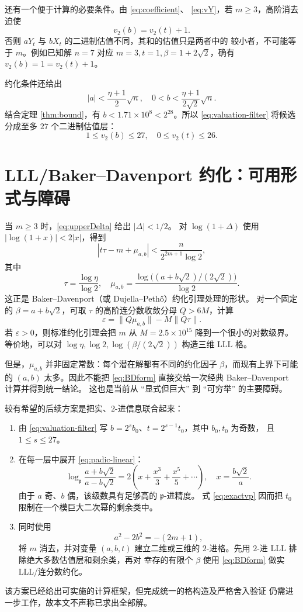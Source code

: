 \documentclass[11pt,a4paper]{ctexart}
\theoremstyle{remark}
\begin{document}
还有一个便于计算的必要条件。由 \eqref{eq:coefficient}、
\eqref{eq:vY}，若 \(m\ge3\)，高阶消去迫使
\begin{equation}\label{eq:valuation-filter}
 \boxed{v_2(b)=v_2(t)+1.}
\end{equation}
否则 \(aY_t\) 与 \(bX_t\) 的二进制估值不同，其和的估值只是两者中的
较小者，不可能等于 \(m\)。例如已知解 \(n=7\) 对应
\(m=3,t=1,\beta=1+2\sqrt2\)，确有 \(v_2(b)=1=v_2(t)+1\)。

约化条件还给出
\[
 |a|<\frac{\eta+1}{2}\sqrt n,\quad
 0<b<\frac{\eta+1}{2\sqrt2}\sqrt n.
\]
结合定理 \ref{thm:bound}，有 \(b<1.71\times10^8<2^{28}\)。所以
\eqref{eq:valuation-filter} 将候选分成至多 \(27\) 个二进制估值层：
\[
 1\le v_2(b)\le27,\quad 0\le v_2(t)\le26.
\]

\section{LLL/Baker--Davenport 约化：可用形式与障碍}

当 \(m\ge3\) 时，\eqref{eq:upperDelta} 给出 \(|\Delta|<1/2\)。
对 \(\log(1+\Delta)\) 使用 \(|\log(1+x)|<2|x|\)，得到
\begin{equation}\label{eq:BDform}
 \left|t\tau-m+\mu_{a,b}\right|
 <\frac{n}{2^{2m+1}\log2},
\end{equation}
其中
\begin{equation}\label{eq:taumu}
 \tau=\frac{\log\eta}{\log2},\quad
 \mu_{a,b}=\frac{\log\bigl((a+b\sqrt2)/(2\sqrt2)\bigr)}{\log2}.
\end{equation}
这正是 Baker--Davenport（或 Dujella--Peth\H{o}）约化引理处理的形状。
对一个固定的 \(\beta=a+b\sqrt2\)，可取 \(\tau\) 的高阶连分数收敛分母
\(Q>6M\)，计算
\[
 \varepsilon=\|Q\mu_{a,b}\|-M\|Q\tau\|.
\]
若 \(\varepsilon>0\)，则标准约化引理会把 \(m\) 从
\(M=2.5\times10^{15}\) 降到一个很小的对数级界。等价地，可以对
\(\log\eta,\log2,\log(\beta/(2\sqrt2))\) 构造三维 LLL 格。

但是，\(\mu_{a,b}\) 并非固定常数：每个潜在解都有不同的约化因子
\(\beta\)，而现有上界下可能的 \((a,b)\) 太多。因此不能把
\eqref{eq:BDform} 直接交给一次经典 Baker--Davenport 计算并得到统一结论。
这也是当前从 ``显式但巨大'' 到 ``可穷举'' 的主要障碍。

较有希望的后续方案是把实、\(2\)-进信息联合起来：
\begin{enumerate}
 \item 由 \eqref{eq:valuation-filter} 写
 \(b=2^s b_0\)、\(t=2^{s-1}t_0\)，其中 \(b_0,t_0\) 为奇数，
 且 \(1\le s\le27\)。
 \item 在每一层中展开 \eqref{eq:padic-linear}：
 \[
 \log_{\mathfrak p}\frac{a+b\sqrt2}{a-b\sqrt2}
 =2\left(x+\frac{x^3}{3}+\frac{x^5}{5}+\cdots\right),
 \quad x=\frac{b\sqrt2}{a}.
 \]
 由于 \(a\) 奇、\(b\) 偶，该级数具有足够高的 \(\mathfrak p\)-进精度。
 式 \eqref{eq:exactvp} 因而把 \(t_0\) 限制在一个模巨大二次幂的剩余类中。
 \item 同时使用
 \[
 a^2-2b^2=-(2m+1),
 \]
 将 \(m\) 消去，并对变量 \((a,b,t)\) 建立二维或三维的
 \(2\)-进格。先用 \(2\)-进 LLL 排除绝大多数估值层和剩余类，再对
 幸存的有限个 \(\beta\) 使用 \eqref{eq:BDform} 做实 LLL/连分数约化。
\end{enumerate}
该方案已经给出可实施的计算框架，但完成统一的格构造及严格舍入验证
仍需进一步工作，故本文不声称已求出全部解。
\end{document}
